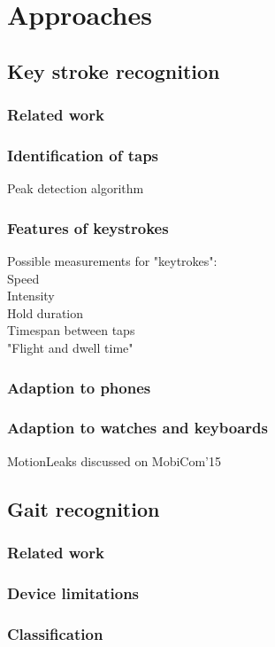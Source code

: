 \chapter{Approaches}\label{chapter:approaches}

\section{Key stroke recognition}
\subsection{Related work}
\subsection{Identification of taps}
Peak detection algorithm \cite{palshikar2009simple}
\subsection{Features of keystrokes}
\cite{dholi2013typing}
Possible measurements for "keytrokes":\\
Speed\\
Intensity\\
Hold duration\\
Timespan between taps\\
"Flight and dwell time"\\

\subsection{Adaption to phones}
\subsection{Adaption to watches and keyboards}
MotionLeaks discussed on MobiCom'15

\section{Gait recognition}
\subsection{Related work}
\subsection{Device limitations}
\subsection{Classification}